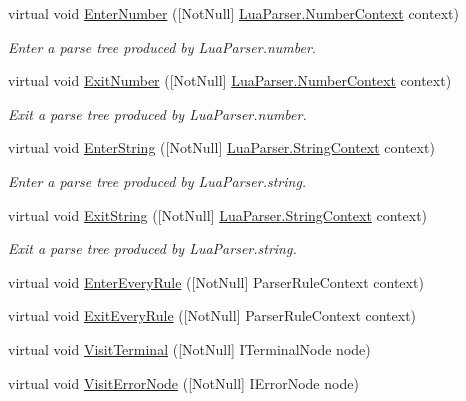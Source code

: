 \begin{DoxyCompactItemize}
virtual void \mbox{\hyperlink{classzlua_1_1_lua_base_listener_a7a5db34cbf48dd81e72604d07e0e0038}{Enter\+Number}} (\mbox{[}Not\+Null\mbox{]} \mbox{\hyperlink{classzlua_1_1_lua_parser_1_1_number_context}{Lua\+Parser.\+Number\+Context}} context)
\begin{DoxyCompactList}\small\item\em Enter a parse tree produced by Lua\+Parser.\+number. \end{DoxyCompactList}\item 
virtual void \mbox{\hyperlink{classzlua_1_1_lua_base_listener_a64548a4ec69a61b39e8a7c6d2f022e83}{Exit\+Number}} (\mbox{[}Not\+Null\mbox{]} \mbox{\hyperlink{classzlua_1_1_lua_parser_1_1_number_context}{Lua\+Parser.\+Number\+Context}} context)
\begin{DoxyCompactList}\small\item\em Exit a parse tree produced by Lua\+Parser.\+number. \end{DoxyCompactList}\item 
virtual void \mbox{\hyperlink{classzlua_1_1_lua_base_listener_a98b2e77fa39477251ef47c023d51d559}{Enter\+String}} (\mbox{[}Not\+Null\mbox{]} \mbox{\hyperlink{classzlua_1_1_lua_parser_1_1_string_context}{Lua\+Parser.\+String\+Context}} context)
\begin{DoxyCompactList}\small\item\em Enter a parse tree produced by Lua\+Parser.\+string. \end{DoxyCompactList}\item 
virtual void \mbox{\hyperlink{classzlua_1_1_lua_base_listener_ac80dc12b34aee654e56ecc7e37a77ac7}{Exit\+String}} (\mbox{[}Not\+Null\mbox{]} \mbox{\hyperlink{classzlua_1_1_lua_parser_1_1_string_context}{Lua\+Parser.\+String\+Context}} context)
\begin{DoxyCompactList}\small\item\em Exit a parse tree produced by Lua\+Parser.\+string. \end{DoxyCompactList}\item 
virtual void \mbox{\hyperlink{classzlua_1_1_lua_base_listener_aa20d29905862d24106bf15e909816993}{Enter\+Every\+Rule}} (\mbox{[}Not\+Null\mbox{]} Parser\+Rule\+Context context)
\item 
virtual void \mbox{\hyperlink{classzlua_1_1_lua_base_listener_a06107a9f8d26fc9fdc1f7364074d8d05}{Exit\+Every\+Rule}} (\mbox{[}Not\+Null\mbox{]} Parser\+Rule\+Context context)
\item 
virtual void \mbox{\hyperlink{classzlua_1_1_lua_base_listener_a8cb7657e2ecbfc55be50ecb82ad121aa}{Visit\+Terminal}} (\mbox{[}Not\+Null\mbox{]} I\+Terminal\+Node node)
\item 
virtual void \mbox{\hyperlink{classzlua_1_1_lua_base_listener_abd2e864ac32107d653a410868637a8f7}{Visit\+Error\+Node}} (\mbox{[}Not\+Null\mbox{]} I\+Error\+Node node)
\end{DoxyCompactItemize}



